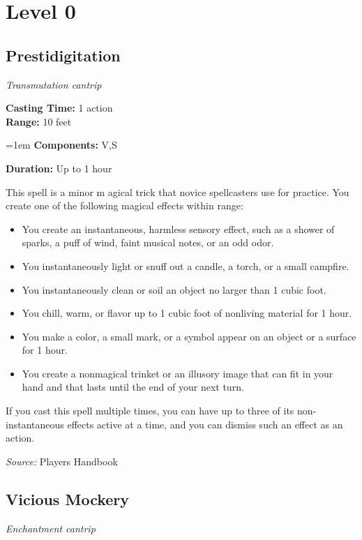 \documentclass[10pt,twoside,twocolumn]{article}
\newlength{\mylen}
\begin{document}
\selectfont %

\section{Level 0}
\subsection{Prestidigitation}
\textit{Transmutation cantrip}
\smallskip

\noindent
\textbf{Casting Time:}  1 action\\
\textbf{Range:}  10 feet

\noindent
\hangindent=1em
\textbf{Components:}  V,S

\noindent
\textbf{Duration:}  Up to 1 hour\\
\smallskip



This spell is a minor m agical trick that novice spellcasters use for practice. You create one of the following magical effects within range:


\renewcommand\labelitemi{\raisebox{\mylen}{\tiny$\bullet$}}
\begin{itemize}
\setlength\itemsep{-.25em}
\item You create an instantaneous, harmless sensory effect, such as a shower of sparks, a puff of wind, faint musical notes, or an odd odor.
\item You instantaneously light or snuff out a candle, a torch, or a small campfire.
\item You instantaneously clean or soil an object no larger than 1 cubic foot.
\item You chill, warm, or flavor up to 1 cubic foot of nonliving material for 1 hour.
\item You make a color, a small mark, or a symbol appear on an object or a surface for 1 hour.
\item You create a nonmagical trinket or an illusory image that can fit in your hand and that lasts until the end of your next turn.
\end{itemize}
If you cast this spell multiple times, you can have up to three of its non-instantaneous effects active at a time, and you can dismiss such an effect as an action.



\textit{Source:} Players Handbook

\subsection{Vicious Mockery}
\textit{Enchantment cantrip}
\smallskip
\end{document}
